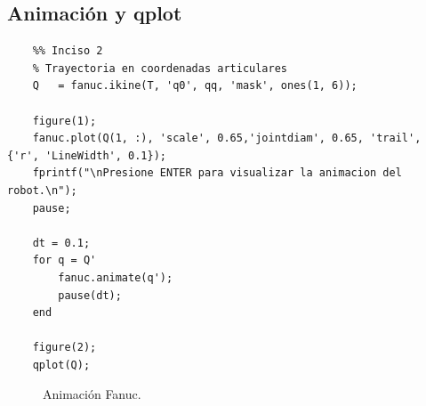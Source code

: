\documentclass[a4paper,12pt]{article}
\begin{document}
\subsection{Animación y qplot}
\begin{lstlisting}
    %% Inciso 2
    % Trayectoria en coordenadas articulares
    Q   = fanuc.ikine(T, 'q0', qq, 'mask', ones(1, 6));

    figure(1);
    fanuc.plot(Q(1, :), 'scale', 0.65,'jointdiam', 0.65, 'trail', {'r', 'LineWidth', 0.1});
    fprintf("\nPresione ENTER para visualizar la animacion del robot.\n");
    pause;

    dt = 0.1;
    for q = Q'
        fanuc.animate(q');
        pause(dt);
    end

    figure(2);
    qplot(Q);
\end{lstlisting}

\begin{figure}[H]
    \centering
    \begin{adjustbox}{scale = 0.65, max width=\columnwidth}
    \end{adjustbox}
    \caption{Animación Fanuc.}
\end{figure}
\end{document}
